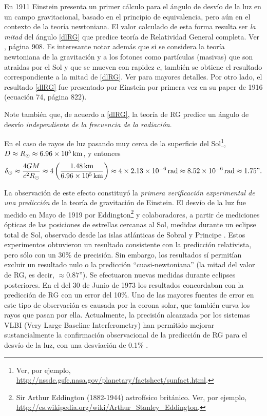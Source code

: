 En 1911 Einstein presenta un primer cálculo para el ángulo de desvío de la luz en un campo gravitacional, basado en el principio de equivalencia, pero aún en el contexto de la teoría newtoniana. El valor calculado de esta forma resulta ser \textit{la mitad} del ángulo \eqref{dlRG} que predice teoría de Relatividad General completa. Ver \cite{Einstein11}, página 908. Es interesante notar además que si se considera la teoría newtoniana de la gravitación y a los fotones como partículas (masivas) que son atraidas por el Sol y que se mueven con rapidez $c$, también se obtiene el resultado correspondiente a la mitad de \eqref{dlRG}. Ver \cite{Will88} para mayores detalles.  Por otro lado, el resultado \eqref{dlRG} fue presentado por Einstein por primera vez en su paper de 1916 \cite{Einstein16} (ecuación 74, página 822).

Note también que, de acuerdo a \eqref{dlRG}, la teoría de RG predice un ángulo de desvío \textit{independiente de la frecuencia de la radiación}.

En el caso de rayos de luz pasando muy cerca de la superficie del Sol\footnote{Ver, por ejemplo, \url{http://nssdc.gsfc.nasa.gov/planetary/factsheet/sunfact.html}.}, $D\approx R_\odot\approx 6.96\times 10^5\text{\,km}$, y entonces
\begin{equation}
\delta_\odot\approx\frac{4GM}{c^2R_\odot}\approx 4\left(\frac{1.48\text{\,km}}{6.96\times 10^5\text{\,km}}\right)\approx 4\times 2.13\times 10^{-6}{\rm\, rad}\approx 8.52\times 10^{-6}{\rm\, rad}\approx 1.75\text{''}.
\end{equation}

La observación de este efecto constituyó la \textit{primera verificación experimental de una predicción} de la teoría de gravitación de Einstein. El desvío de la luz fue medido en Mayo de 1919 por Eddington\footnote{Sir Arthur Eddington (1882-1944) astrofísico británico. Ver, por ejemplo, \url{http://es.wikipedia.org/wiki/Arthur_Stanley_Eddington}.} y colaboradores, a partir de mediciones ópticas de las posiciones de estrellas cercanas al Sol, medidas durante un eclipse total de Sol, observado desde las islas atlánticas de Sobral y Principe \cite{DED19}. Estos experimentos obtuvieron un resultado consistente con la predicción relativista, pero sólo con un 30\% de precisión. Sin embargo, los resultados sí permitían excluir un resultado nulo o la predicción ``cuasi-newtoniana'' (la mitad del valor de RG, es decir, $\approx 0.87$''). Se efectuaron nuevas medidas durante eclipses posteriores. En el del 30 de Junio de 1973 los resultados concordaban con la predicción de RG con un error del 10\%. Uno de las mayores fuentes de error en este tipo de observación es causada por la corona solar, que también curva los rayos que pasan por ella. Actualmente, la precisión alcanzada por los sistemas VLBI (Very Large Baseline Interferometry) han permitido mejorar sustancialmente la confirmación observacional de la predicción de RG para el desvío de la luz, con una desviación de 0.1\% \cite{SDLG04,Will06}.

